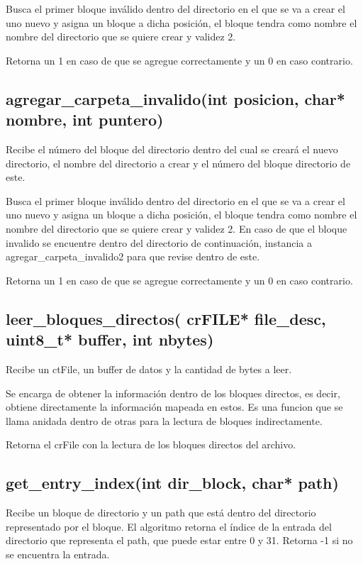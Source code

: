 \documentclass[12pt]{article}
\begin{document}
Busca el primer bloque inválido dentro del directorio en el que se va a crear el uno nuevo y asigna un bloque a dicha posición, el bloque tendra como nombre el nombre del directorio que se quiere crear y validez 2.

Retorna un 1 en caso de que se agregue correctamente y un 0 en caso contrario.


\subsection{agregar\_carpeta\_invalido(int posicion, char* nombre, int puntero)}
Recibe el número del bloque del directorio dentro del cual se creará el nuevo directorio, el nombre del directorio a crear y el número del bloque directorio de este.

Busca el primer bloque inválido dentro del directorio en el que se va a crear el uno nuevo y asigna un bloque a dicha posición, el bloque tendra como nombre el nombre del directorio que se quiere crear y validez 2. En caso de que el bloque invalido se encuentre dentro del directorio de continuación, instancia a agregar\_carpeta\_invalido2 para que revise dentro de este.

Retorna un 1 en caso de que se agregue correctamente y un 0 en caso contrario.

\subsection{leer\_bloques\_directos( crFILE* file\_desc, uint8\_t* buffer, int nbytes)}
Recibe un ctFile, un buffer de datos y la cantidad de bytes a leer.

Se encarga de obtener la información dentro de los bloques directos, es decir, obtiene directamente la información mapeada en estos. Es una funcion que se llama anidada dentro de otras para la lectura de bloques indirectamente.

Retorna el crFile con la lectura de los bloques directos del archivo.

\subsection{get\_entry\_index(int dir\_block, char* path)}
Recibe un bloque de directorio y un path que está dentro del directorio representado por el bloque. El algoritmo retorna el índice de la entrada del directorio que representa el path, que puede estar entre 0 y 31. Retorna -1 si no se encuentra la entrada.
\end{document}
